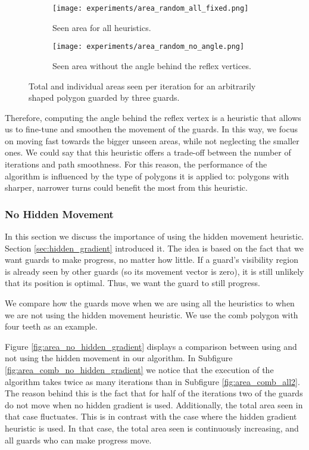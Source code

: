 \begin{figure}[h!]
    \begin{subfigure}{0.45\textwidth}
        \texttt{[image: experiments/area\_random\_all\_fixed.png]}
        \caption{Seen area for all heuristics.}
        \label{fig:area_all_angle}
    \end{subfigure}
    \hfill
    \begin{subfigure}{0.45\textwidth}
        \texttt{[image: experiments/area\_random\_no\_angle.png]}
        \caption{Seen area without the angle behind the reflex vertices.}
        \label{fig:area_no_angle}
    \end{subfigure}
    \caption{Total and individual areas seen per iteration for an arbitrarily shaped polygon guarded by three guards.}
    \label{fig:no_angle_plots}
\end{figure}

Therefore, computing the angle behind the reflex vertex is a heuristic that allows us to fine-tune and smoothen the movement of the guards. In this way, we  focus on moving fast towards the bigger unseen areas, while not neglecting the smaller ones. We could say that this heuristic offers a trade-off between the number of iterations and path smoothness. For this reason, the performance of the algorithm is influenced by the type of polygons it is applied to: polygons with sharper, narrower turns could benefit the most from this heuristic.


\subsubsection{No Hidden Movement}
In this section we  discuss the importance of using the hidden movement heuristic. Section \ref{sec:hidden_gradient} introduced it. The idea is based on the fact that we want guards to make progress, no matter how little. If a guard's visibility region is already seen by other guards (so its movement vector is zero), it is still unlikely that its position is optimal. Thus, we want the guard to still progress.

We  compare how the guards move when we are using all the heuristics to when we are not using the hidden movement heuristic. We  use the comb polygon with four teeth as an example. 

Figure \ref{fig:area_no_hidden_gradient} displays a comparison between using and not using the hidden movement in our algorithm. In Subfigure \ref{fig:area_comb_no_hidden_gradient} we  notice that the execution of the algorithm takes twice as many iterations than in Subfigure \ref{fig:area_comb_all2}. The reason behind this is the fact that for half of the iterations two of the guards do not move when no hidden gradient is used. Additionally, the total area seen in that case fluctuates. This is in contrast with the case where the hidden gradient heuristic is used. In that case, the total area seen is continuously increasing, and all guards who can make progress move.

